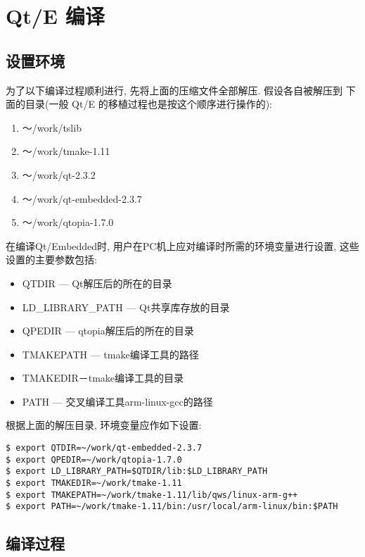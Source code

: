 \section{Qt/E 编译}
\subsection{设置环境}
	为了以下编译过程顺利进行, 先将上面的压缩文件全部解压. 假设各自被解压到
下面的目录(一般 Qt/E 的移植过程也是按这个顺序进行操作的):
\begin{enumerate}\itemsep=-3pt
  \item ～/work/tslib
  \item ～/work/tmake-1.11
  \item ～/work/qt-2.3.2
  \item ～/work/qt-embedded-2.3.7
  \item ～/work/qtopia-1.7.0
\end{enumerate}

	在编译Qt/Embedded时, 用户在PC机上应对编译时所需的环境变量进行设置, 这些
设置的主要参数包括:
\begin{itemize}\itemsep=-3pt
  \item QTDIR --- Qt解压后的所在的目录
  \item LD\_LIBRARY\_PATH --- Qt共享库存放的目录
  \item QPEDIR --- qtopia解压后的所在的目录
  \item TMAKEPATH --- tmake编译工具的路径
  \item TMAKEDIR－tmake编译工具的目录
  \item PATH --- 交叉编译工具arm-linux-gcc的路径
\end{itemize}

	根据上面的解压目录, 环境变量应作如下设置:

\begin{boxedminipage}{.9\textwidth}
\begin{verbatim}
$ export QTDIR=~/work/qt-embedded-2.3.7
$ export QPEDIR=~/work/qtopia-1.7.0
$ export LD_LIBRARY_PATH=$QTDIR/lib:$LD_LIBRARY_PATH
$ export TMAKEDIR=~/work/tmake-1.11
$ export TMAKEPATH=~/work/tmake-1.11/lib/qws/linux-arm-g++
$ export PATH=~/work/tmake-1.11/bin:/usr/local/arm-linux/bin:$PATH
\end{verbatim}
\end{boxedminipage}

\subsection{编译过程}
